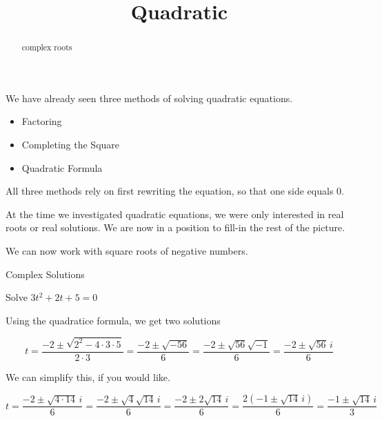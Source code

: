 \documentclass{ximera}
\title{Quadratic}
\begin{document}
\begin{abstract}
complex roots
\end{abstract}
\maketitle





We have already seen three methods of solving quadratic equations.

\begin{itemize}
	\item Factoring
	\item Completing the Square
	\item Quadratic Formula
	\end{itemize}


All three methods rely on first rewriting the equation, so that one side equals $0$.

At the time we investigated quadratic equations, we were only interested in real roots or real solutions.  We are now in a position to fill-in the rest of the picture.


We can now work with square roots of negative numbers.


\begin{example} Complex Solutions

Solve $3t^2 + 2t + 5 = 0$

Using the quadratice formula, we get two solutions

\[  t = \frac{-2 \pm \sqrt{2^2 - 4 \cdot 3 \cdot 5}}{2 \cdot 3}   =  \frac{-2 \pm \sqrt{-56}}{6}  =  \frac{-2 \pm \sqrt{56}\sqrt{-1}}{6}   =  \frac{-2 \pm \sqrt{56} \, i}{6}  \]



We can simplify this, if you would like.


\[  t = \frac{-2 \pm \sqrt{4 \cdot 14} \, i}{6}  = \frac{-2 \pm \sqrt{4} \sqrt{14} \, i}{6} = \frac{-2 \pm 2 \sqrt{14} \, i}{6} = \frac{2(-1 \pm \sqrt{14} \, i)}{6}   = \frac{-1 \pm \sqrt{14} \, i}{3}   \]



\end{example}
\end{document}
